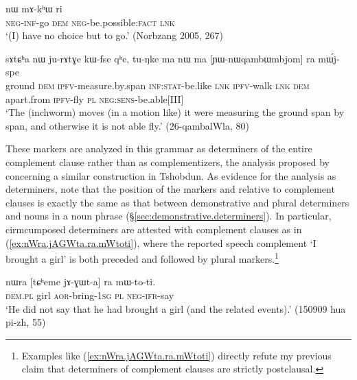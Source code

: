  \begin{exe}
\ex \label{ex:mAkACe.nW.mAkhW}
\gll [mɤ-kɤ-ɕe] nɯ mɤ-kʰɯ ri \\
\textsc{neg}-\textsc{inf}-go \textsc{dem} \textsc{neg}-be.possible:\textsc{fact} \textsc{lnk} \\
\glt `(I) have no choice but to go.' (Norbzang 2005, 267)
\end{exe}

 \begin{exe}
\ex \label{ex:YWnWqambWmbjom.ra.mWjspe}
\gll  sɤtɕʰa nɯ ju-rɤtɣe kɯ-fse qʰe, tu-ŋke ma nɯ ma [ɲɯ-nɯqambɯmbjom] ra mɯ́j-spe \\
ground \textsc{dem} \textsc{ipfv}-measure.by.span \textsc{inf}:\textsc{stat}-be.like \textsc{lnk} \textsc{ipfv}-walk \textsc{lnk} \textsc{dem} apart.from \textsc{ipfv}-fly \textsc{pl} \textsc{neg}:\textsc{sens}-be.able[III] \\
\glt `The (inchworm) moves (in a motion like) it were measuring the ground span by span, and otherwise it is not able fly.' (26-qambalWla, 80)
\end{exe}
 
These markers are analyzed in this grammar as determiners of the entire complement clause rather than as complementizers, the analysis proposed by \citet[481]{sun12complementation} concerning a similar construction in Tshobdun. As evidence for the analysis as determiners, note that the position of the markers  and  relative to complement clauses  is exactly the same as that between demonstrative and plural determiners and nouns in a noun phrase (§\ref{sec:demonstrative.determiners}). In particular, cirmcumposed determiners are attested with complement clauses as in (\ref{ex:nWra.jAGWta.ra.mWtoti}), where the reported speech complement  `I brought a girl' is both preceded and followed by plural markers.\footnote{Examples like (\ref{ex:nWra.jAGWta.ra.mWtoti}) directly refute my previous claim \citep[258]{jacques16complementation} that determiners of complement clauses are strictly postclausal. }

\begin{exe}
\ex \label{ex:nWra.jAGWta.ra.mWtoti}
\gll nɯra [tɕʰeme jɤ-ɣɯt-a] ra mɯ-to-ti. \\
\textsc{dem}.\textsc{pl} girl \textsc{aor}-bring-\textsc{1sg} \textsc{pl} \textsc{neg}-\textsc{ifr}-say \\
\glt  `He did not say that he had brought a girl (and the related events).'  (150909 hua pi-zh, 55)
\end{exe}
 
